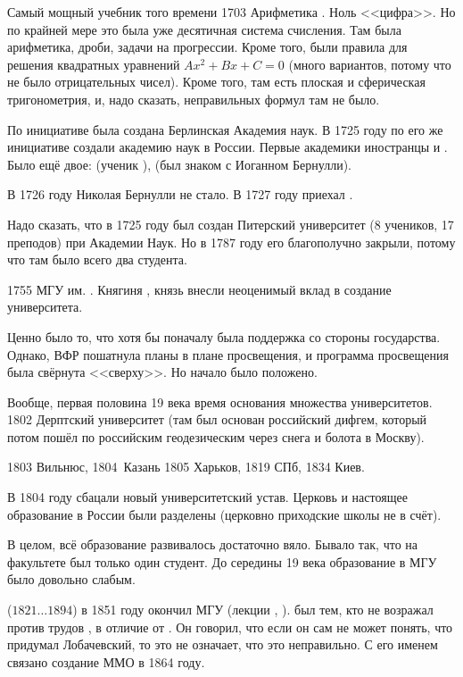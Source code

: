 \documentclass[a4paper,oneside,fleqn,10pt]{article}
\newcommand{\pe}[2]{${#1}\ldots{#2}$}
\begin{document}
Самый мощный учебник того времени 1703 Арифметика .
Ноль <<цифра>>. Но по крайней мере это была уже десятичная система счисления.
Там была арифметика, дроби, задачи на прогрессии. Кроме того, были правила для
решения квадратных уравнений $Ax^2 + Bx + C=0$ (много вариантов, потому что не было
отрицательных чисел). Кроме того, там есть плоская и сферическая тригонометрия,
и, надо сказать, неправильных формул там не было.

По инициативе  была создана Берлинская Академия наук.
В 1725 году по его же инициативе создали академию наук в России.
Первые академики иностранцы  и .
Было ещё двое:  (ученик ),
 (был знаком с Иоганном Бернулли).

В 1726 году Николая Бернулли не стало. В 1727 году приехал .

Надо сказать, что в 1725 году был создан Питерский университет (8 учеников, 17 преподов)
при Академии Наук. Но в 1787 году его благополучно закрыли, потому что там было всего два студента.

1755 МГУ им. . Княгиня , князь  внесли неоценимый вклад
в создание университета.

Ценно было то, что хотя бы поначалу была поддержка со стороны государства.
Однако, ВФР пошатнула планы  в плане просвещения, и программа просвещения была свёрнута
<<сверху>>. Но начало было положено.

Вообще, первая половина 19 века время основания множества университетов.
1802 Дерптский университет (там  был основан российский дифгем, который потом пошёл
по российским геодезическим через снега и болота в Москву).

1803 Вильнюс, 1804\ Казань 1805 Харьков, 1819 СПб, 1834 Киев.

В 1804 году сбацали новый университетский устав.
Церковь и настоящее образование в России были разделены
(церковно приходские школы не в счёт).

В целом, всё образование развивалось достаточно вяло.
Бывало так, что на факультете был только один студент.
До середины 19 века образование в МГУ было довольно слабым.

 (\pe{1821}{1894}) в 1851 году окончил МГУ (лекции , ).
 был тем, кто не возражал против трудов ,
в отличие от . Он говорил, что если он сам не может понять,
что придумал Лобачевский, то это не означает, что это неправильно.
С его именем связано создание ММО в 1864 году.
\end{document}
